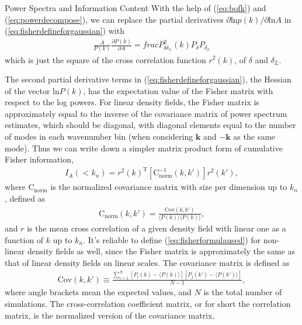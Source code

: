 \begin{section}{Power Spectra and Information Content}
   With the help of (\ref{eq:bofk}) and (\ref{eq:powerdecompose}), we can replace the partial derivatives 
$\partial \mathrm{ln} p(k) / \partial \mathrm{ln} A$ in (\ref{eq:fisherdefineforgaussian}) with 
\begin{align}
   \frac{A}{P(k)}\frac{\partial P(k)}{\partial A}=frac{P_{\delta \delta_L}^2(k)}{P_\delta P_{\delta_L}}
\end{align}
which is just the square of the 
cross correlation function $r ^2 (k)$, of $\delta$ and $\delta_L$. 

The second partial derivative terms in 
(\ref{eq:fisherdefineforgaussian}), the Hessian of the vector $\mathrm{ln} P(k)$, has the expectation 
value of the Fisher matrix with respect to the log powers. For linear density fields, the Fisher matrix is 
approximately equal to the inverse of the covariance matrix of power spectrum estimates, which should be diagonal, 
with diagonal elements equal to the number of modes in each wavenumber bin (when considering $\bm{k}$ and $-\bm{k}$ 
as the same mode). Thus we can write down a simpler matrix product form of cumulative Fisher information, 
\begin{align}
    I_A \left( < k_n\right) = r^2(k)^{\mathrm{T}} \left[ \mathrm{C^{-1}_{norm}} ( k,k' )\right] r^2(k') ,
\label{eq:fisherformulaused}
\end{align}
where $\mathrm{C_{norm}}$ is the normalized covariance matrix with size per dimension up to $k_n$, defined as
\begin{align}
    \mathrm{C_{norm}} \left( k,k' \right)=\frac{\mathrm{Cov}(k,k')}{\langle P(k)\rangle\langle P(k)\rangle},
\end{align}
and $r$ is the mean cross correlation of a given density field with linear one as a function of $k$ up to $k_n$. 
It's reliable to define (\ref{eq:fisherformulaused}) for non-linear density fields as well, 
since the Fisher matrix is approximately the same as that of linear density fields on linear scales. 
The covariance matrix is defined as 
\begin{align}
    \mathrm{Cov}\left(k,k'\right)\equiv \frac{\sum_{i=1}^{N}\left[ P_i \left( k \right) - 
\langle P \left( k \right) \rangle \right]\left[ P_j \left( k' \right) - \langle P \left( k' \right)\rangle \right]}{N-1},
\end{align}
where angle brackets mean the expected values, and $N$ is the total number of simulations.
    The  cross-correlation coefficient matrix, or for short the correlation matrix, is the normalized version of the covariance matrix,

\end{section}
